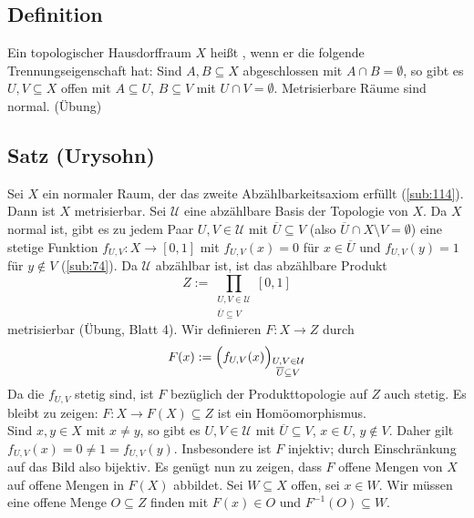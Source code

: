 \subsection[Definition: Normaler Hausdorffraum]{Definition} %
\label{sub:72}
Ein topologischer Hausdorffraum $X$ heißt , wenn er die folgende Trennungseigenschaft hat: Sind $A,B \subseteq X$ abgeschlossen mit
$A \cap B = \emptyset$, so gibt es $U,V \subseteq X$ offen mit $A \subseteq U$, $B \subseteq V$ mit $U \cap V = \emptyset$.
Metrisierbare Räume sind normal. \hfill (Übung) 

\subsection{Satz (Urysohn)} %
\label{sub:73}
Sei $X$ ein normaler Raum, der das zweite Abzählbarkeitsaxiom erfüllt (\ref{sub:114}). Dann ist $X$ metrisierbar.
Sei $\mathcal{U}$ eine abzählbare Basis der Topologie von $X$. Da $X$ normal ist, gibt es zu jedem Paar $U,V \in \mathcal{U}$ mit $\overline{U} \subseteq V $ (also
$\overline{U} \cap X \setminus V = \emptyset $) eine stetige Funktion $f_{U,V} : X \to [0,1]$ mit $f_{U,V} (x) = 0$ für $x \in \overline{U}$ und
$f_{U,V}(y) = 1$ für $y \not\in V$ (\ref{sub:74}). Da $\mathcal{U}$ abzählbar ist, ist das abzählbare Produkt 
\[
	Z := \prod_{\substack{U,V \in \mathcal{U} \\ \overline{U} \subseteq V}} [0,1]
\]
metrisierbar (Übung, Blatt 4).
Wir definieren $F : X \to Z$ durch
\[
	F(x) := \enbrace[\Big]{f_{U,V}(x)}_{\substack{U,V \in \mathcal{U} \\ \overline{U} \subseteq V}} 
\]
Da die $f_{U,V}$ stetig sind, ist $F$ bezüglich der Produkttopologie auf $Z$ auch stetig. Es bleibt zu zeigen: $F : X \to F(X) \subseteq Z$ ist ein Homöomorphismus.\smallskip \\
Sind $x,y \in X$ mit $x \not= y$, so gibt es $U,V \in \mathcal{U}$ mit $\overline{U} \subseteq V$, $x \in U$, $y \not\in V$. Daher gilt $f_{U,V} (x) = 0 \not= 1 = f_{U,V}(y)$.
Insbesondere ist $F$ injektiv; durch Einschränkung auf das Bild also bijektiv. Es genügt nun zu zeigen, dass $F$ offene Mengen von $X$ auf offene Mengen in $F(X)$ abbildet.
Sei $W \subseteq X$ offen, sei $x \in W$. Wir müssen eine offene Menge $O \subseteq Z$ finden mit $F(x) \in O$ und $F ^{-1}(O) \subseteq W$.

